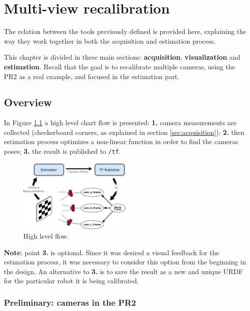 \chapter{Multi-view recalibration}
\label{cha:multi-view calibration}

\vspace*{-3ex}
The relation between the tools previously defined is provided here, explaining the way they work together in both the acquisition and estimation process.

This chapter is divided in three main sections: \textbf{acquisition}, \textbf{visualization} and \textbf{estimation}. Recall that the goal is to recalibrate multiple cameras, using the PR2 as a real example, and focused in the estimation part.

\section{Overview}
\label{sec:estimation_overview}

In Figure \ref{fig:high_level_flow} a high level chart flow is presented: \textbf{1.} camera measurements are collected (checkerboard corners, as explained in section \ref{sec:acquisition}); \textbf{2.} then estimation process optimizes a non-linear function in order to find the cameras poses; \textbf{3.} the result is published to \texttt{/tf}.

\begin{figure}[!htbp]
 \centering
 \includegraphics[width=0.5\textwidth]{images/high_level_flow_02.png}
 \caption{High level flow.}
 \label{fig:high_level_flow}
\end{figure}

\noindent
\textbf{Note}: point \textbf{3.} is optional. Since it was desired a visual feedback for the estimation process, it was necessary to consider this option from the beginning in the design. An alternative to \textbf{3.} is to save the result as a new and unique URDF for the particular robot it is being calibrated.



\subsection*{Preliminary: cameras in the PR2}

